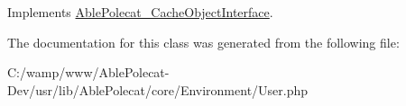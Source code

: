 Implements \hyperlink{interface_able_polecat___cache_object_interface_a3f2135f6ad45f51d075657f6d20db2cd}{Able\+Polecat\+\_\+\+Cache\+Object\+Interface}.



The documentation for this class was generated from the following file\+:\begin{DoxyCompactItemize}
\item 
C\+:/wamp/www/\+Able\+Polecat-\/\+Dev/usr/lib/\+Able\+Polecat/core/\+Environment/User.\+php\end{DoxyCompactItemize}
